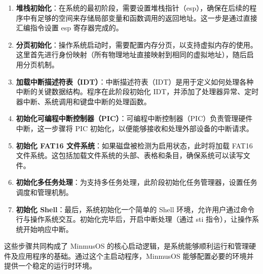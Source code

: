 \begin{enumerate}
    \item \textbf{堆栈初始化}：在系统的最初阶段，需要设置堆栈指针（esp），确保在后续的程序中有足够的空间来存储局部变量和函数调用的返回地址。这一步是通过直接汇编指令设置 esp 寄存器完成的。
    \item \textbf{分页初始化}：操作系统启动时，需要配置内存分页，以支持虚拟内存的使用。这里首先进行身份映射（所有物理地址直接映射到相同的虚拟地址），随后启用分页机制。
    \item \textbf{加载中断描述符表（IDT）}：中断描述符表（IDT）是用于定义如何处理各种中断的关键数据结构。程序在此阶段初始化 IDT，并添加了处理器异常、定时器中断、系统调用和键盘中断的处理函数。
    \item \textbf{初始化可编程中断控制器（PIC）}：可编程中断控制器（PIC）负责管理硬件中断，这一步骤将 PIC 初始化，以便能够接收和处理外部设备的中断请求。
    \item \textbf{初始化 FAT16 文件系统}：如果磁盘被检测为启用状态，此时将加载 FAT16 文件系统。这包括加载文件系统的头部、表格和条目，确保系统可以读写文件。
    \item \textbf{初始化多任务处理}：为支持多任务处理，此阶段初始化任务管理器，设置任务调度和管理机制。
    \item \textbf{初始化 Shell}：最后，系统初始化一个简单的 Shell 环境，允许用户通过命令行与操作系统交互。初始化完毕后，开启中断处理（通过 sti 指令），让操作系统开始响应中断。
\end{enumerate}

这些步骤共同构成了 MinmusOS 的核心启动逻辑，是系统能够顺利运行和管理硬件及应用程序的基础。通过这个主启动程序，MinmusOS 能够配置必要的环境并提供一个稳定的运行时环境。

